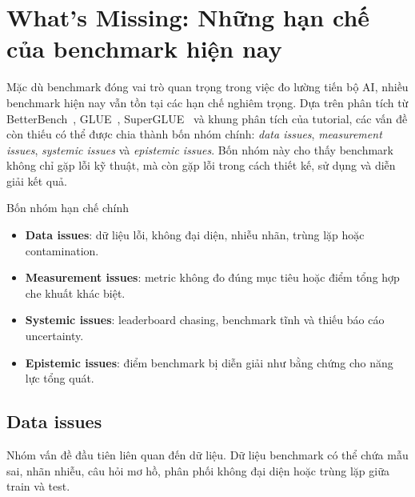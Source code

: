 
\section{What's Missing: Những hạn chế của benchmark hiện nay}
\label{sec:whats-missing}

Mặc dù benchmark đóng vai trò quan trọng trong việc đo lường tiến bộ AI, nhiều benchmark hiện nay vẫn tồn tại các hạn chế nghiêm trọng. Dựa trên phân tích từ BetterBench~\cite{betterbench}, GLUE~\cite{glue}, SuperGLUE~\cite{superglue} và khung phân tích của tutorial, các vấn đề còn thiếu có thể được chia thành bốn nhóm chính: \textit{data issues}, \textit{measurement issues}, \textit{systemic issues} và \textit{epistemic issues}. Bốn nhóm này cho thấy benchmark không chỉ gặp lỗi kỹ thuật, mà còn gặp lỗi trong cách thiết kế, sử dụng và diễn giải kết quả.

\begin{summarybox}{Bốn nhóm hạn chế chính}
\begin{itemize}
    \item \textbf{Data issues}: dữ liệu lỗi, không đại diện, nhiễu nhãn, trùng lặp hoặc contamination.
    \item \textbf{Measurement issues}: metric không đo đúng mục tiêu hoặc điểm tổng hợp che khuất khác biệt.
    \item \textbf{Systemic issues}: leaderboard chasing, benchmark tĩnh và thiếu báo cáo uncertainty.
    \item \textbf{Epistemic issues}: điểm benchmark bị diễn giải như bằng chứng cho năng lực tổng quát.
\end{itemize}
\end{summarybox}

\subsection{Data issues}

Nhóm vấn đề đầu tiên liên quan đến dữ liệu. Dữ liệu benchmark có thể chứa mẫu sai, nhãn nhiễu, câu hỏi mơ hồ, phân phối không đại diện hoặc trùng lặp giữa train và test.

